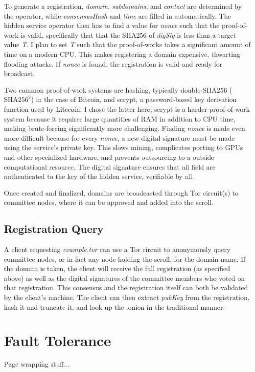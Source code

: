 To generate a registration, \textit{domain}, \textit{subdomains}, and \textit{contact} are determined by the operator, while \textit{consensusHash} and \textit{time} are filled in automatically. The hidden service operator then has to find a value for \textit{nonce} such that the proof-of-work is valid, specifically that that the SHA256 of \textit{digSig} is less than a target value \textit{T}. I plan to set \textit{T} such that the proof-of-works takes a significant amount of time on a modern CPU. This makes registering a domain expensive, thwarting flooding attacks. If \textit{nonce} is found, the registration is valid and ready for broadcast.

Two common proof-of-work systems are hashing, typically double-SHA256 ($ \textrm{SHA}256^{{2}} $) in the case of Bitcoin, and scrypt, a password-based key derivation function used by Litecoin. I chose the latter here; scrypt is a harder proof-of-work system because it requires large quantities of RAM in addition to CPU time, making brute-forcing significantly more challenging. Finding \textit{nonce} is made even more difficult because for every \textit{nonce}, a new digital signature must be made using the service's private key. This slows mining, complicates porting to GPUs and other specialized hardware, and prevents outsourcing to a outside computational resource. The digital signature ensures that all field are authenticated to the key of the hidden service, verifiable by all.

Once created and finalized, domains are broadcasted through Tor circuit(s) to committee nodes, where it can be approved and added into the scroll.

\subsection{Registration Query}

A client requesting \textit{example.tor} can use a Tor circuit to anonymously query committee nodes, or in fact any node holding the scroll, for the domain name. If the domain is taken, the client will receive the full registration (as specified above) as well as the digital signatures of the committee members who voted on that registration. This consensus and the registration itself can both be validated by the client's machine. The client can then extract \textit{pubKey} from the registration, hash it and truncate it, and look up the .onion in the traditional manner.




\section{Fault Tolerance}

Page wrapping stuff...